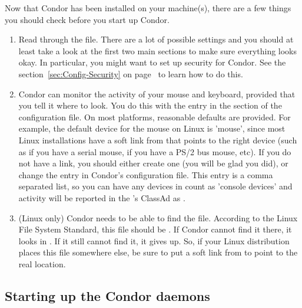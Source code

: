 Now that Condor has been installed on your machine(s), there are a few
things you should check before you start up Condor.

\begin{enumerate}
\item Read through the  file.  There are a
    lot of possible settings and you should at least take a look at
    the first two main sections to make sure everything looks okay.
    In particular, you might want to set up security for
    Condor.  See the section~\ref{sec:Config-Security} on
    page~\pageref{sec:Config-Security} to learn how to do this.

\item Condor can monitor the activity of your mouse and keyboard,
    provided that you tell it where to look.  You do this with the
     entry in the  section of
    the configuration file.  On most platforms, reasonable
    defaults are provided.
    For example, the default device for the mouse on Linux
    is 'mouse', since most Linux installations have a soft link from
     that points to the right device (such as
     if you have a serial mouse,  if you have
    a PS/2 bus mouse, etc).  If you do not have a 
    link, you should either create one (you will be glad you did), or
    change the  entry in Condor's
    configuration file.
    This entry is a comma separated list, so you can have any
    devices in  count as 'console devices' and activity
    will be reported in the 's ClassAd as
    .

\item  (Linux only) Condor needs to be able to find the  file.
    According to the Linux File System Standard, this file should be
    .  If Condor cannot find it there, it looks in
    .  If it still cannot find it, it gives up.  So, if
    your Linux distribution places this file somewhere else, be sure to
    put a soft link from  to point to the real location.

\end{enumerate}

\subsection{\label{sec:Run-Condor} Starting up the Condor daemons}


